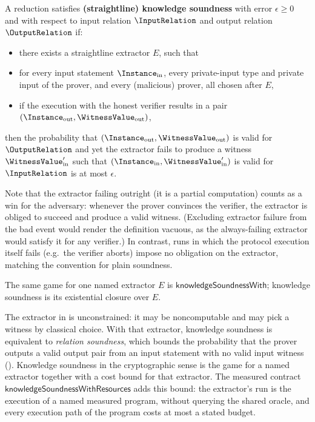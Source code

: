 \begin{definition}
    \label{def:knowledge_soundness}
    A reduction satisfies \textbf{(straightline) knowledge soundness} with error \(\epsilon \geq 0\) and
    with respect to input relation \(\InputRelation\) and output relation \(\OutputRelation\) if:
    \begin{itemize}
        \item there exists a straightline extractor \(E\), such that
        \item for every input statement \(\Instance_{\text{in}}\), every private-input type and private input
        of the prover, and every (malicious) prover, all chosen after \(E\),
        \item if the execution with the honest verifier results in a pair \((\Instance_{\text{out}}, \WitnessValue_{\text{out}})\),
    \end{itemize}
    then the probability that \((\Instance_{\text{out}}, \WitnessValue_{\text{out}})\) is valid for \(\OutputRelation\) and yet the extractor fails to produce a witness \(\WitnessValue'_{\text{in}}\) such that \((\Instance_{\text{in}}, \WitnessValue'_{\text{in}})\) is valid for \(\InputRelation\) is at most \(\epsilon\).

    Note that the extractor failing outright (it is a partial computation) counts as a win for the adversary: whenever the prover convinces the verifier, the extractor is obliged to succeed and produce a valid witness. (Excluding extractor failure from the bad event would render the definition vacuous, as the always-failing extractor would satisfy it for any verifier.) In contrast, runs in which the protocol execution itself fails (e.g.\ the verifier aborts) impose no obligation on the extractor, matching the convention for plain soundness.

    The same game for one named extractor \(E\) is \(\mathsf{knowledgeSoundnessWith}\); knowledge
    soundness is its existential closure over \(E\).
    \leanok
\end{definition}

\begin{remark}
    \label{rem:extraction_cost}
    The extractor in  is unconstrained: it may be noncomputable and
    may pick a witness by classical choice. With that extractor, knowledge soundness is equivalent
    to \emph{relation soundness}, which bounds the probability that the prover outputs a valid
    output pair from an input statement with no valid input witness
    (). Knowledge soundness in the
    cryptographic sense is the game for a named extractor together with a cost bound for that
    extractor. The measured contract
    \(\mathsf{knowledgeSoundnessWithResources}\) adds this bound: the extractor's run is the
    execution of a named measured program, without querying the shared oracle, and every
    execution path of the program costs at most a stated budget.
\end{remark}

